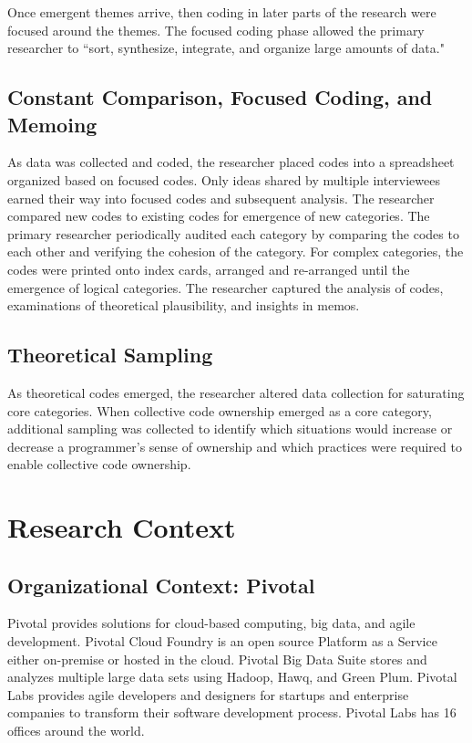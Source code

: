 Once emergent themes arrive, then coding in later parts of the research were focused around the themes. The focused coding phase allowed the primary researcher to ``sort, synthesize, integrate, and organize large amounts of data."
\subsection{Constant Comparison, Focused Coding, and Memoing}
As data was collected and coded, the researcher placed codes into a spreadsheet organized based on focused codes. Only ideas shared by multiple interviewees earned their way into focused codes and subsequent analysis. The researcher compared new codes to existing codes for emergence of new categories. The primary researcher periodically audited each category by comparing the codes to each other and verifying the cohesion of the category. For complex categories, the codes were printed onto index cards, arranged and re-arranged until the emergence of logical categories.  The researcher captured the analysis of codes, examinations of theoretical plausibility, and insights in memos. 

\subsection{Theoretical Sampling}
As theoretical codes emerged, the researcher altered data collection for saturating core categories. When collective code ownership emerged as a core category, additional sampling was collected to identify which situations would increase or decrease a programmer's sense of ownership and which practices were required to enable collective code ownership.

\section{Research Context}
\label{ResearchContext}
\subsection{Organizational Context: Pivotal}
Pivotal provides solutions for cloud-based computing, big data, and agile development. Pivotal Cloud Foundry is an open source Platform as a Service either on-premise or hosted in the cloud. Pivotal Big Data Suite stores and analyzes multiple large data sets using Hadoop, Hawq, and Green Plum. Pivotal Labs provides agile developers and designers for startups and enterprise companies to transform their software development process. Pivotal Labs has 16 offices around the world.

